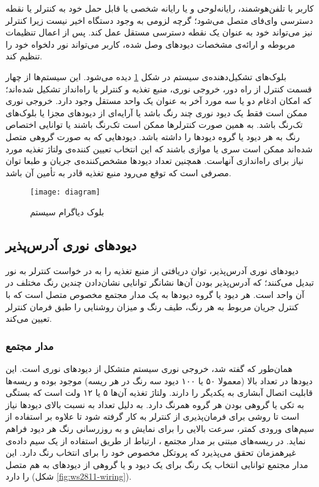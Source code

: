 \documentclass[12pt,twocolumn,a4paper,oneside]{article}
\begin{document}
کاربر با تلفن‌هوشمند، رایانه‌لوحی و یا رایانه شخصی یا قابل حمل خود به کنترلر یا نقطه دسترسی وای‌فای متصل می‌شود؛ گرچه لزومی به وجود دستگاه اخیر نیست زیرا کنترلر نیز می‌تواند خود به عنوان یک نقطه دسترسی مستقل عمل کند. پس از اعمال تنظیمات مربوطه و ارائه‌ی مشخصات دیودهای وصل شده، کاربر می‌تواند نور دلخواه خود را تنظیم کند.

بلوک‌های تشکیل‌دهنده‌ی سیستم در شکل
\ref{fig:diagram}
دیده می‌شود. این سیستم‌ها از چهار قسمت کنترل از راه دور، خروجی نوری، منبع تغذیه و کنترلر یا راه‌انداز تشکیل شده‌اند؛ که امکان ادغام دو یا سه مورد آخر به عنوان یک واحد مستقل وجود دارد. خروجی نوری ممکن است فقط یک دیود نوری چند رنگ باشد یا آرایه‌ای از دیودهای مجزا یا بلوک‌های تک‌رنگ باشد. به همین صورت کنترلرها ممکن است تک‌رنگ باشند یا توانایی اختصاص رنگ به هر دیود یا گروه دیودها را داشته باشد. دیودهایی که به صورت گروهی متصل شده‌اند ممکن است سری یا موازی باشند که این انتخاب تعیین کننده‌ی ولتاژ تغذیه مورد نیاز برای راه‌اندازی آنهاست. همچنین تعداد دیودها مشخص‌کننده‌ی جریان و طبعا توان مصرفی است که توقع می‌رود منبع تغذیه قادر به تأمین آن باشد.

\begin{figure}[ht]
\centering
\texttt{[image: diagram]}
\caption{بلوک دیاگرام سیستم}
\label{fig:diagram}
\end{figure}

\subsection{دیودهای نوری آدرس‌پذیر}
دیودهای نوری آدرس‌پذیر، توان دریافتی از منبع تغذیه را به در خواست کنترلر به نور تبدیل می‌کنند؛ که آدرس‌پذیر بودن آن‌ها نشانگر توانایی نشان‌دادن چندین رنگ مختلف در آن واحد است. هر دیود یا گروه دیودها به یک مدار مجتمع مخصوص متصل است که با کنترل جریان مربوط به هر رنگ، طیف رنگ و میزان روشنایی را طبق فرمان کنترلر تعیین می‌کند.

\subsubsection{مدار مجتمع }
همان‌طور که گفته شد، خروجی نوری سیستم متشکل از دیودهای نوری است. این دیودها در تعداد بالا (معمولا  ۵۰ یا ۱۰۰ دیود سه رنگ در هر ریسه) موجود بوده و ریسه‌ها قابلیت اتصال آبشاری به یکدیگر را دارند. ولتاژ تغذیه آن‌ها ۵ یا ۱۲ ولت است که بستگی به تکی یا گروهی بودن هر گروه همرنگ دارد. به دلیل تعداد به نسبت بالای دیودها نیاز است تا روشی برای فرمان‌پذیری از کنترلر به کار گرفته شود تا علاوه بر استفاده از سیم‌های ورودی کمتر، سرعت بالایی را برای نمایش و به روزرسانی رنگ هر دیود فراهم نماید. در ریسه‌های مبتنی بر مدار مجتمع ، ارتباط از طریق استفاده از یک سیم داده‌ی غیرهمزمان تحقق می‌پذیرد که پروتکل مخصوص خود را برای انتخاب رنگ دارد. این مدار مجتمع توانایی انتخاب یک رنگ برای یک دیود و یا گروهی از دیودهای به هم متصل را دارد (شکل  \ref{fig:ws2811-wiring}).
\end{document}
